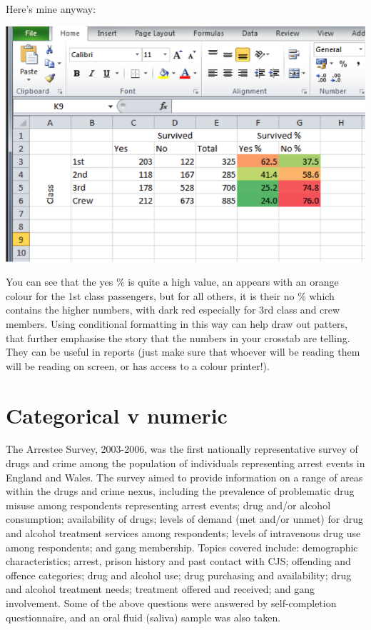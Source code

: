 \documentclass[
]{book}
\begin{document}
Here's mine anyway:

\includegraphics{imgs/cond_form_3.png}

You can see that the yes \% is quite a high value, an appears with an orange colour for the 1st class passengers, but for all others, it is their no \% which contains the higher numbers, with dark red especially for 3rd class and crew members. Using conditional formatting in this way can help draw out patters, that further emphasise the story that the numbers in your crosstab are telling. They can be useful in reports (just make sure that whoever will be reading them will be reading on screen, or has access to a colour printer!).

\hypertarget{categorical-v-numeric}{%
\section{Categorical v numeric}\label{categorical-v-numeric}}

The Arrestee Survey, 2003-2006, was the first nationally representative survey of drugs and crime among the population of individuals representing arrest events in England and Wales. The survey aimed to provide information on a range of areas within the drugs and crime nexus, including the prevalence of problematic drug misuse among respondents representing arrest events; drug and/or alcohol consumption; availability of drugs; levels of demand (met and/or unmet) for drug and alcohol treatment services among respondents; levels of intravenous drug use among respondents; and gang membership. Topics covered include: demographic characteristics; arrest, prison history and past contact with CJS; offending and offence categories; drug and alcohol use; drug purchasing and availability; drug and alcohol treatment needs; treatment offered and received; and gang involvement. Some of the above questions were answered by self-completion questionnaire, and an oral fluid (saliva) sample was also taken.
\end{document}
